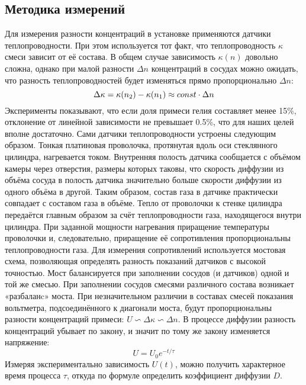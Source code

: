 	 \subsection*{Методика измерений}\n
	 Для измерения разности концентраций в установке применяются датчики теплопроводности. При этом используется тот факт, что теплопроводность $\kappa$ смеси зависит от её состава. В общем случае зависимость $\kappa(n)$ довольно сложна, однако при малой разности $\Delta n$ концентраций в сосудах можно ожидать, что разность теплопроводностей будет изменяться прямо пропорционально $\Delta n$:
	 \[\Delta \kappa = \kappa(n_2) - \kappa(n_1) \approx const \cdot \Delta n\]\n
	 Эксперименты показывают, что если доля примеси гелия составляет менее 15\%, отклонение от линейной зависимости не превышает 0.5\%, что для наших целей вполне достаточно.\n\n
	 Сами датчики теплопроводности устроены следующим образом. Тонкая
платиновая проволочка, протянутая вдоль оси стеклянного цилиндра,
нагревается током. Внутренняя полость датчика сообщается с объёмом
камеры через отверстия, размеры которых таковы, что скорость диффузии
из объёма сосуда в полость датчика значительно больше скорости диффузии из одного объёма в другой. Таким образом, состав газа в датчике практически совпадает с составом газа в объёме. Тепло от проволочки к стенке
цилиндра передаётся главным образом за счёт теплопроводности газа, находящегося внутри цилиндра. При заданной мощности нагревания приращение температуры проволочки и, следовательно, приращение её сопротивления пропорциональны теплопроводности газа.\n\n
Для измерения сопротивлений используется мостовая схема, позволяющая определять разность показаний датчиков с высокой точностью.
Мост балансируется при заполнении сосудов (и датчиков) одной и той же
смесью. При заполнении сосудов смесями различного состава возникает
«разбаланc» моста. При незначительном различии в составах смесей показания вольтметра, подсоединённого к диагонали моста, будут пропорциональны разности концентраций примеси: $U \backsim \Delta \kappa \backsim \Delta n$. В процессе
диффузии разность концентраций убывает по закону, и значит по тому
же закону изменяется напряжение:
\[U = U_0 e^{-t / \tau}\]
	Измеряя экспериментально зависимость $U(t)$, можно получить характерное время процесса $\tau$, откуда по формуле определить коэффициент диффузии $D$.\newpage
	
